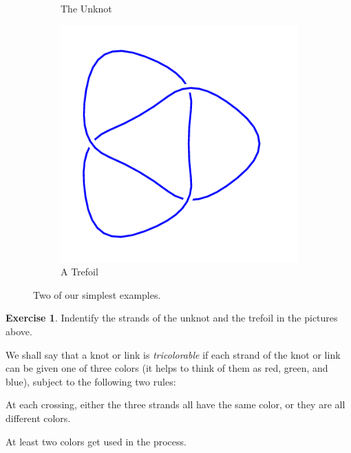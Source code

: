 \documentclass[12pt,letterpaper]{article}
\theoremstyle{definition}
\newtheorem{exercise}[question]{Exercise}
\begin{document}
\begin{figure}[h]
    \centering
    \begin{subfigure}{.3\textwidth}
        \caption{The Unknot}
    \end{subfigure}
    \hspace{1cm}
    \begin{subfigure}{.3\textwidth}
        \includegraphics[width=\textwidth]{rgp08pics/3_1mirror.png}
        \caption{A Trefoil}
    \end{subfigure}
    \caption{Two of our simplest examples.}
\end{figure}

\begin{exercise}
Indentify the strands of the unknot and the trefoil in the pictures above.
\end{exercise}

We shall say that a knot or link is \emph{tricolorable} if each strand of the knot or link can be given one of three colors (it helps to think of them as red, green, and blue), subject to the following two rules:
\begin{compactitem}
\item At each crossing, either the three strands all have the same color, or they are all different colors.
\item At least two colors get used in the process.
\end{compactitem}
\end{document}
